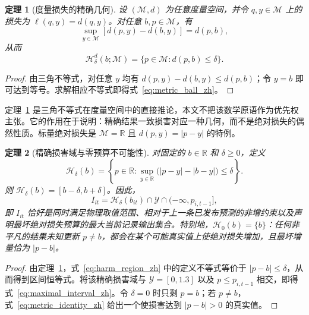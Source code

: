 \documentclass[UTF8,11pt]{ctexart}
\newtheorem{theorem}{定理}
\newcommand{\R}{\mathbb{R}}
\begin{document}
\begin{theorem}[度量损失的精确几何]
\label{thm:metric_harm_zh}
设 $(\mathcal M,d)$ 为任意度量空间，并令 $q,y\in\mathcal M$ 上的损失为 $\ell(q,y)=d(q,y)$。对任意 $b,p\in\mathcal M$，有
\begin{equation}
  \sup_{y\in\mathcal M}\left[d(p,y)-d(b,y)\right]=d(p,b),
  \label{eq:metric_identity_zh}
\end{equation}
从而
\begin{equation}
  \mathcal H^{d}_{\delta}(b;\mathcal M)
  =\{p\in\mathcal M:d(p,b)\leq\delta\}.
  \label{eq:metric_ball_zh}
\end{equation}
\end{theorem}
\begin{proof}
由三角不等式，对任意 $y$ 均有 $d(p,y)-d(b,y)\leq d(p,b)$；令 $y=b$ 即可达到等号。求解相应不等式即得式~\eqref{eq:metric_ball_zh}。
\end{proof}

定理~\ref{thm:metric_harm_zh} 是三角不等式在度量空间中的直接推论，本文不把该数学原语作为优先权主张。它的作用在于说明：精确结果一致损害对应一种几何，而不是绝对损失的偶然性质。标量绝对损失是 $\mathcal M=\R$ 且 $d(p,y)=|p-y|$ 的特例。

\begin{theorem}[精确损害域与零预算不可能性]
\label{thm:harm_region_zh}
对固定的 $b\in\R$ 和 $\delta\geq0$，定义
\begin{equation}
  \mathcal H_\delta(b)=\left\{p\in\R:
  \sup_{y\in\R}\bigl(|p-y|-|b-y|\bigr)\leq\delta\right\}.
  \label{eq:harm_region_zh}
\end{equation}
则 $\mathcal H_\delta(b)=[b-\delta,b+\delta]$。因此，
\begin{equation}
  I_{it}=\mathcal H_\delta(b_{it})\cap\mathcal Y
  \cap(-\infty,p_{i,t-1}],
  \label{eq:maximal_interval_zh}
\end{equation}
即 $I_{it}$ 恰好是同时满足物理取值范围、相对于上一条已发布预测的非增约束以及声明最坏绝对损失预算的最大当前记录输出集合。特别地，$\mathcal H_0(b)=\{b\}$：任何非平凡的结果未知更新 $p\neq b$，都会在某个可能真实值上使绝对损失增加，且最坏增量恰为 $|p-b|$。
\end{theorem}
\begin{proof}
由定理~\ref{thm:metric_harm_zh}，式~\eqref{eq:harm_region_zh} 中的定义不等式等价于 $|p-b|\leq\delta$，从而得到区间恒等式。将该精确损害域与 $\mathcal Y=[0,1.3]$ 以及 $p\leq p_{i,t-1}$ 相交，即得式~\eqref{eq:maximal_interval_zh}。令 $\delta=0$ 时只剩 $p=b$；若 $p\neq b$，式~\eqref{eq:metric_identity_zh} 给出一个使损害达到 $|p-b|>0$ 的真实值。
\end{proof}
\end{document}
